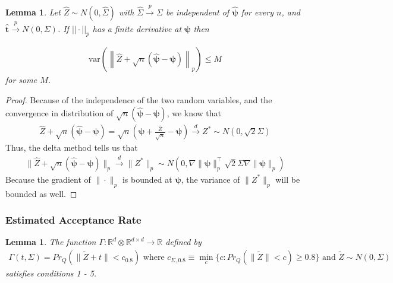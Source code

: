 \documentclass{article}
\newtheorem{lemma}[theorem]{Lemma}
\newcommand{\vmat}{\Sigma}
\newcommand{\tst}{\hat{\boldsymbol{t}}}
\newcommand{\rvv}{Z}
\newcommand{\distv}{Q}
\newcounter{conditions}
\begin{document}
\begin{lemma}
	Let $\hat{Z} \sim N(0, \hat{\Sigma})$ with $\hat{\Sigma} \xrightarrow{p} \Sigma$ be independent of $\hat{\boldsymbol{\psi}}$ for every $n$, and $\tst \xrightarrow{p} N(0, \Sigma)$.  If $||\cdot||_p$ has a finite derivative at $\boldsymbol{\psi}$ then 

	\begin{align*}
		\text{var}\left(\left\|\hat{Z} + \sqrt{n}\left(\hat{\boldsymbol{\psi}} - \boldsymbol{\psi}\right) \right\|_p\right) \leq M
	\end{align*}
	for some $M$.
\end{lemma}

\begin{proof}
	Because of the independence of the two random variables, and the convergence in distribution of $\sqrt{n}\left(\hat{\boldsymbol{\psi}} - \boldsymbol{\psi}\right)$, we know that
	\begin{align*}
		\hat{Z} + \sqrt{n}\left(\hat{\boldsymbol{\psi}} - \boldsymbol{\psi}\right) =  \sqrt{n}\left(\hat{\boldsymbol{\psi}} + \frac{\hat{Z}}{\sqrt{n}} - \boldsymbol{\psi}\right) \xrightarrow{d} Z^* \sim N(0, \sqrt{2} \Sigma)
	\end{align*}
	Thus, the delta method tells us that
	\begin{align*}
		\|\hat{Z} + \sqrt{n}\left(\hat{\boldsymbol{\psi}} - \boldsymbol{\psi}\right)\|_p \xrightarrow{d} \|Z^*\|_p \sim N\left(0, \nabla\|\boldsymbol{\psi}\|_p^\top \sqrt{2}\Sigma \nabla\|\boldsymbol{\psi}\|_p \right)
	\end{align*}
	Because the gradient of $\|\cdot\|_p$ is bounded at $ \boldsymbol{\psi}$, the variance of $\|Z^*\|_p$ will be bounded as well.
\end{proof}

\subsubsection{Estimated Acceptance Rate}

\begin{lemma}
	\label{lemma:est_accept}
	The function $\Gamma : \mathbb{R}^d \otimes \mathbb{R}^{d \times d} \to \mathbb{R}$ defined by 
	\begin{align*}
		\Gamma(t, \Sigma) = Pr_\distv(\|\tilde\rvv + t\| < c_{0.8})  \text{ where }  c_{\vmat, 0.8} \equiv \min_{c}\{c : Pr_\distv(\|\tilde\rvv\| < c) \geq 0.8 \} \text{ and } \tilde\rvv \sim N(0, \Sigma)
	\end{align*}
	satisfies conditions 1 - 5.
\end{lemma}
\end{document}
